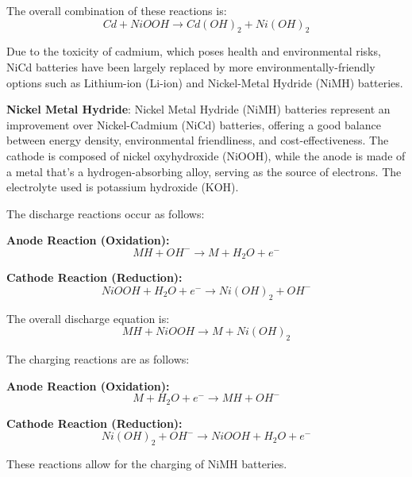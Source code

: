 \documentclass{article}
\begin{document}
\begin{flushleft}
The overall combination of these reactions is:
\begin{equation*}
    Cd + NiOOH \rightarrow Cd(OH)_2 + Ni(OH)_2
\end{equation*}

Due to the toxicity of cadmium, which poses health and environmental risks, NiCd batteries have been largely replaced by more environmentally-friendly options such as Lithium-ion (Li-ion) and Nickel-Metal Hydride (NiMH) batteries.
\newline
\vspace*{3pt}

\textbf{Nickel Metal Hydride}: Nickel Metal Hydride (NiMH) batteries represent an improvement over Nickel-Cadmium (NiCd) batteries, offering a good balance between energy density, environmental friendliness, and cost-effectiveness. The cathode is composed of nickel oxyhydroxide (NiOOH), while the anode is made of a metal that's a hydrogen-absorbing alloy, serving as the source of electrons. The electrolyte used is potassium hydroxide (KOH).

The discharge reactions occur as follows:

\textbf{Anode Reaction (Oxidation):}
\begin{equation*}
    MH + OH^- \rightarrow M + H_2O + e^-
\end{equation*}

\textbf{Cathode Reaction (Reduction):}
\begin{equation*}
    NiOOH + H_2O + e^- \rightarrow Ni(OH)_2 + OH^-
\end{equation*}

The overall discharge equation is:
\begin{equation*}
    MH + NiOOH \rightarrow M + Ni(OH)_2
\end{equation*}

The charging reactions are as follows:

\textbf{Anode Reaction (Oxidation):}
\begin{equation*}
    M + H_2O + e^- \rightarrow MH + OH^-
\end{equation*}

\textbf{Cathode Reaction (Reduction):}
\begin{equation*}
    Ni(OH)_2 + OH^- \rightarrow NiOOH + H_2O + e^-
\end{equation*}

These reactions allow for the charging of NiMH batteries.
\newline
\vspace*{3pt}


\end{flushleft}
\end{document}
